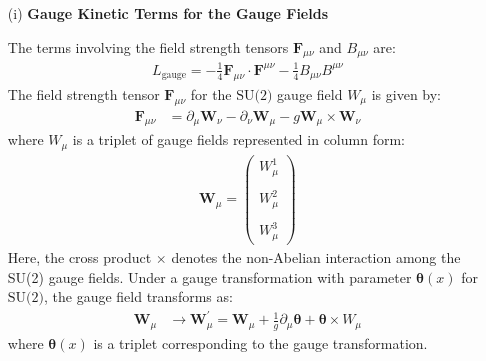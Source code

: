 \begin{enumerate}
    \item [(i)] \textbf{Gauge Kinetic Terms for the Gauge Fields}

    The terms involving the field strength tensors $\mathbf{F}_{\mu\nu}$ and $B_{\mu\nu}$ are:
    \begin{align}
        L_{\text{gauge}} = - \frac{1}{4} \mathbf{F}_{\mu\nu} \cdot \mathbf{F}^{\mu\nu} - \frac{1}{4} B_{\mu\nu} B^{\mu\nu}\label{eq:L-gauge-def}
    \end{align}
    The field strength tensor $\mathbf{F}_{\mu\nu}$ for the $\text{SU(2)}$ gauge field $W_\mu$ is given by:
    \begin{align}
        \mathbf{F}_{\mu\nu} &= \partial_\mu \mathbf{W}_\nu - \partial_\nu \mathbf{W}_\mu - g \mathbf{W}_\mu \times \mathbf{W}_\nu 
    \end{align}
    where $W_\mu$ is a triplet of gauge fields represented in column form:
    \begin{align*}
        \mathbf{W}_\mu = \begin{pmatrix} W_\mu^1 \\\\ W_\mu^2 \\\\ W_\mu^3 \end{pmatrix}
    \end{align*}
    Here, the cross product $\times$ denotes the non-Abelian interaction among the SU(2) gauge fields. Under a gauge transformation with parameter $\boldsymbol{\theta}(x)$ for $\text{SU(2)}$, the gauge field transforms as:
    \begin{align*}
        \mathbf{W}_\mu &\to \mathbf{W}_\mu^\prime = \mathbf{W}_\mu + \frac{1}{g} \partial_\mu \boldsymbol{\theta} + \boldsymbol{\theta} \times W_\mu
    \end{align*}
    where $\boldsymbol{\theta}(x)$ is a triplet corresponding to the gauge transformation.


\end{enumerate}
